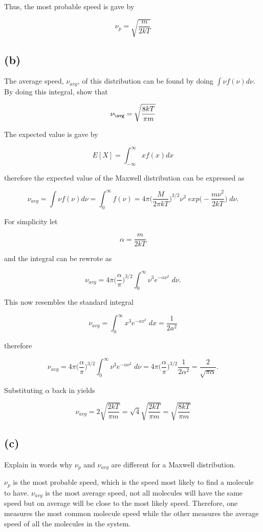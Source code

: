 \documentclass[11pt]{article}
\begin{document}
Thus, the most probable speed is gave by

$$
\nu_{p} = \sqrt{\frac{m}{2kT}}
$$

\subsection*{(b)}

The average speed, $\nu_{avg}$, of this distribution can be found by doing $\int \nu f(\nu) d\nu$. By doing this integral, show that

$$
\nu_{\avg} = \sqrt{\frac{8kT}{\pi m}}
$$

The expected value is gave by 

$$
E[X] = \int_{-\infty}^{\infty} xf(x)dx
$$

therefore the expected value of the Maxwell distribution can be expressed as

$$
\nu_{avg} = \int \nu f(\nu) d\nu = \int_{0}^{\infty} f(\nu) = 4\pi\Bigg(\frac{M}{2\pi k T}\Bigg)^{3/2} \nu^{3} \; exp\Bigg( -\frac{m \nu^{2}}{2kT}\Bigg) \; d\nu .
$$

For simplicity let 

$$
\alpha = \frac{m}{2kT}
$$

and the integral can be rewrote as

$$
\nu_{avg} = 4\pi \Bigg(\frac{\alpha}{\pi}\Bigg)^{3/2} \int_{0}^{\infty} \nu^{3} e^{-\alpha \nu^{2}} \; d\nu.
$$

This now resembles the standard integral 

$$
\nu_{avg} = \int_{0}^{\infty} x^{3} e^{-ax^{2}} \; dx = \frac{1}{2a^{2}}
$$

therefore 

$$
\nu_{avg} = 4\pi \Bigg(\frac{\alpha}{\pi}\Bigg)^{3/2} \int_{0}^{\infty} \nu^{3} e^{-\alpha \nu^{2}} \; d\nu = 4\pi \Bigg(\frac{\alpha}{\pi}\Bigg)^{3/2} \frac{1}{2\alpha^{2}} = \frac{2}{\sqrt{\pi \alpha}}.
$$

Substituting $\alpha$ back in yields

$$
\nu_{avg} = 2\sqrt{\frac{2kT}{\pi m}} = \sqrt{4}\sqrt{\frac{2kT}{\pi m}} = \sqrt{\frac{8kT}{\pi m}} 
$$

\subsection*{(c)}

Explain in words why $\nu_{p}$ and $\nu_{avg}$ are different for a Maxwell distribution.

$\nu_{p}$ is the most probable speed, which is the speed most likely to find a molecule to have. $\nu_{avg}$ is the most average speed, not all molecules will have the same speed but on average will be close to the most likely speed. Therefore, one measures the most common molecule speed while the other measures the average speed of all the molecules in the system.
\end{document}
